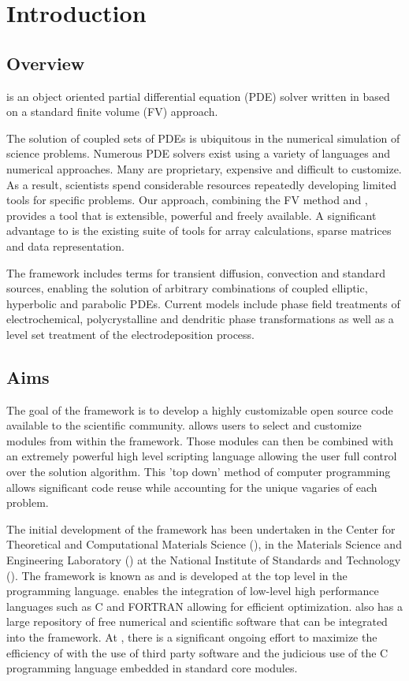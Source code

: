 \chapter{Introduction}

\section{Overview}

\FiPy{} is an object oriented partial differential equation (PDE) solver
written in \Python{} based on a standard
finite volume (FV) approach.

The solution of coupled sets of PDEs is ubiquitous in the numerical
simulation of science problems.  Numerous PDE solvers exist using a
variety of languages and numerical approaches. Many are proprietary,
expensive and difficult to customize.  As a result, scientists spend
considerable resources repeatedly developing limited tools for
specific problems.  Our approach, combining the FV method and
\Python{}, provides a tool that is
extensible, powerful and freely available. A significant advantage to
\Python{} is the existing suite of tools
for array calculations, sparse matrices and data representation.

The \FiPy{} framework includes terms for transient diffusion,
convection and standard sources, enabling the solution of arbitrary
combinations of coupled elliptic, hyperbolic and parabolic
PDEs. Current models include phase field treatments of
electrochemical, polycrystalline and dendritic phase transformations
as well as a level set treatment of the electrodeposition process.

\section{Aims}

The goal of the \FiPy{} framework is to develop a highly customizable
open source code available to the scientific community. \FiPy{} allows
users to select and customize modules from within the framework. Those
modules can then be combined with an extremely powerful high level
scripting language allowing the user full control over the solution
algorithm. This 'top down' method of computer programming allows
significant code reuse while accounting for the unique vagaries of
each problem.

The initial development of the framework has been undertaken in the
Center for Theoretical and Computational Materials Science (\CTCMS{}),
in the Materials Science and Engineering Laboratory (\MSEL{}) at the
National Institute of Standards and Technology (\NIST{}). The
framework is known as \FiPy{} and is developed at the top level in the
\Python{} programming language. \Python{} enables the integration of
low-level high performance languages such as C and FORTRAN allowing
for efficient optimization. \Python{} also has a large repository of
free numerical and scientific software that can be integrated into the
\FiPy{} framework. At \NIST{}, there is a significant ongoing effort
to maximize the efficiency of \FiPy{} with the use of third party
software and the judicious use of the C programming language embedded
in standard core modules.

